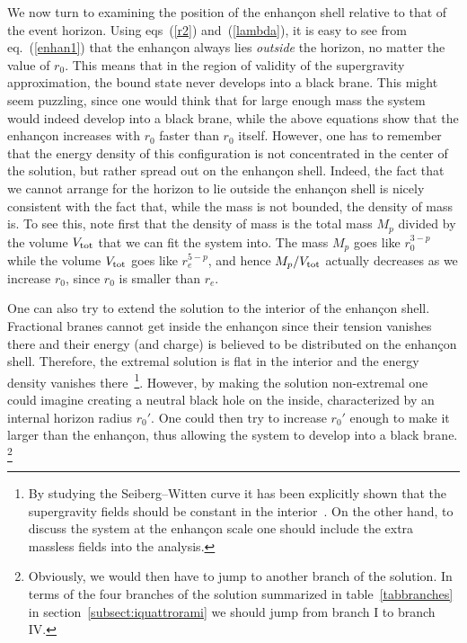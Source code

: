 \documentclass[a4paper,11pt]{article}
\newcommand{\eqref}[1]{(\ref{#1})}
\begin{document}
We now turn to examining the position of the enhan\c{c}on shell
relative to that of the event horizon. Using eqs~\eqref{r2}
and~\eqref{lambda}, it is easy to see from eq.~\eqref{enhan1} that
the enhan\c{c}on always lies \emph{outside} the horizon, no matter
the value of $r_0$. This means that in the region of validity of the
supergravity approximation, the bound state never develops into a
black brane. This might seem puzzling, since one would think that for
large enough mass the system would indeed develop into a black brane,
while the above equations show that the enhan\c{c}on increases with
$r_0$ faster than $r_0$ itself. However, one has to remember that the
energy density of this configuration is not concentrated in the center
of the solution, but rather spread out on the enhan\c{c}on
shell. Indeed, the fact that we cannot arrange for the horizon to lie
outside the enhan\c{c}on shell is nicely consistent with the fact
that, while the mass is not bounded, the density of mass is. To see
this, note first that the density of mass is the total mass $M_p$
divided by the volume $V_{\rm tot}$ that we can fit the system
into. The mass $M_p$ goes like $r_0^{3-p}$ while the volume $V_{\rm
tot}$ goes like $r_e^{5-p}$, and hence $M_p/V_{\rm tot}$ actually
decreases as we increase $r_0$, since $r_0$ is smaller than $r_e$.

One can also try to extend the solution to the interior of the
enhan\c{c}on shell. Fractional branes cannot get inside the
enhan\c{c}on since their tension vanishes there and their energy
(and charge) is believed to be distributed on the enhan\c{c}on shell.
Therefore, the extremal solution is flat in the interior and the energy
density vanishes
there~\cite{Johnson:1999qt,Merlatti:2001gd}\footnote{By studying the
Seiberg--Witten curve it has been explicitly shown that the
supergravity fields should be constant in the
interior~\cite{Petrini:2001fk}. On the other hand, to discuss the
system at the enhan\c{c}on scale one should include the extra massless
fields into the analysis.}. However, by making the solution
non-extremal one could imagine creating a neutral black hole on the
inside, characterized by an internal horizon radius $r_0'$. One could
then try to increase $r_0'$ enough to make it larger than the
enhan\c{c}on, thus allowing the system to develop into a black brane.%
\footnote{Obviously, we would then have to jump to another branch of
the solution. In terms of the four branches of the solution summarized
in table~\ref{tabbranches} in section~\ref{subsect:iquattrorami} we
should jump from branch I to branch IV.}
\end{document}
